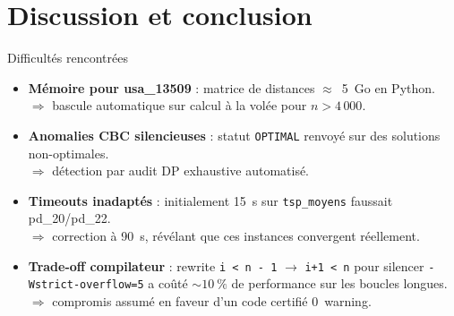 \documentclass[aspectratio=169, 11pt]{beamer}
\begin{document}
\section{Discussion et conclusion}

\begin{frame}{Difficultés rencontrées}
\begin{itemize}
  \item \textbf{Mémoire pour usa\_13509} : matrice de distances $\approx$~5~Go en Python. \\
        $\Rightarrow$ bascule automatique sur calcul à la volée pour $n > 4\,000$.

  \item \textbf{Anomalies CBC silencieuses} : statut \texttt{OPTIMAL} renvoyé sur des solutions non-optimales. \\
        $\Rightarrow$ détection par audit DP exhaustive automatisé.

  \item \textbf{Timeouts inadaptés} : initialement 15~s sur \texttt{tsp\_moyens} faussait pd\_20/pd\_22. \\
        $\Rightarrow$ correction à 90~s, révélant que ces instances convergent réellement.

  \item \textbf{Trade-off compilateur} : rewrite \texttt{i\,\textless\,n\,-\,1} $\to$ \texttt{i+1\,\textless\,n} pour silencer \texttt{-Wstrict-overflow=5} a coûté $\sim 10~\%$ de performance sur les boucles longues. \\
        $\Rightarrow$ compromis assumé en faveur d'un code certifié \alert{0~warning}.
\end{itemize}
\end{frame}
\end{document}

